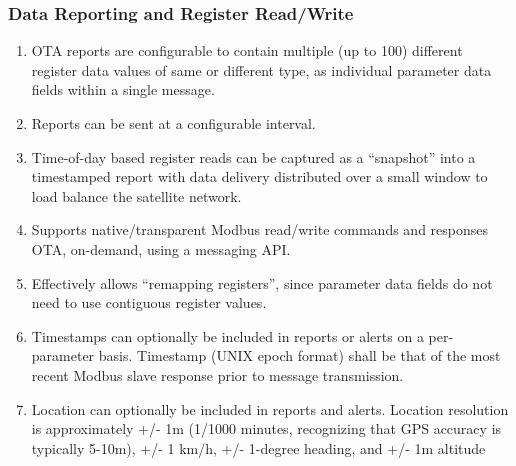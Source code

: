 \documentclass[letterpaper,10pt,english]{sphinxmanual}
\begin{document}
\subsubsection{Data Reporting and Register Read/Write}
\label{\detokenize{funcspec:data-reporting-and-register-read-write}}\begin{enumerate}
\item {} 
OTA reports are configurable to contain multiple (up to 100) different register data values of same or different type, as individual parameter data fields within a single message.

\item {} 
Reports can be sent at a configurable interval.

\item {} 
Time-of-day based register reads can be captured as a “snapshot” into a timestamped report with data delivery distributed over a small window to load balance the satellite network.

\item {} 
Supports native/transparent Modbus read/write commands and responses OTA, on-demand, using a messaging API.

\item {} 
Effectively allows “remapping registers”, since parameter data fields do not need to use contiguous register values.

\item {} 
Timestamps can optionally be included in reports or alerts on a per-parameter basis. Timestamp (UNIX epoch format) shall be that of the most recent Modbus slave response prior to message transmission.

\item {} 
Location can optionally be included in reports and alerts.  Location resolution is approximately +/- 1m (1/1000 minutes, recognizing that GPS accuracy is typically 5-10m), +/- 1 km/h, +/- 1-degree heading, and +/- 1m altitude

\end{enumerate}
\end{document}
